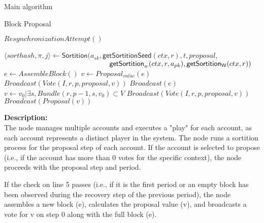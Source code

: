 \documentclass[10pt,a4paper]{article}
\begin{document}
\begin{section}{Main algorithm}
\begin{subsection}{Block Proposal}\label{ssect:blockproposal}

    \begin{algorithm}
        \begin{algorithmic}[1]

            \State $ResynchronizationAttempt()$

                \State $\langle sorthash, \pi, j\rangle\gets 
                \mathsf{Sortition}(
                    a_{sk}, 
                    \mathsf{getSortitionSeed}(ctx, r), 
                    t, 
                    proposal, $ \newline
                    ${}$ ${\hskip 5.2cm}\mathsf{getSortition}_w(ctx, r, a_{pk}), 
                    \mathsf{getSortition_W}(ctx, r)
                )$
                        \State $e \gets AssembleBlock()$
                        \State $v \gets Proposal_{value}(e)$
                        \State $Broadcast(Vote(I, r, p, proposal, v))$
                        \State $Broadcast(e)$
                    \Else
                        \State $v \gets v_0 | \exists s, Bundle(r,p-1,s,v_0) \subset V$
                        \State $Broadcast(Vote(I, r, p, proposal, v))$
                            \State $Broadcast(Proposal(v))$
                        \EndIf
                    \EndIf
                \EndIf
            \EndFor
        \EndFunction
        \end{algorithmic}
        \caption{\underline{Block proposal}}
    \end{algorithm}

\newpage

\noindent \textbf{Description:}\\
The node manages multiple accounts and executes a "play" for each account, 
as each account represents a distinct player in the system. The node runs a 
sortition process for the proposal step of each account. If the account is selected 
to propose (i.e., if the account has more than 0 votes for the specific context), 
the node proceeds with the proposal step and period.

If the check on line 5 passes (i.e., if it is the first period or an empty block
 has been observed during the recovery step of the previous period), 
 the node assembles a new block (e), calculates the proposal value (v), 
 and broadcasts a vote for v on step 0 along with the full block (e).


\end{subsection}
\end{section}
\end{document}
